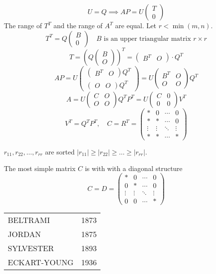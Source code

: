 $$ U = Q \implies AP = U \begin{pmatrix} T \\ 0 \end{pmatrix} $$
The range of $T^T$ and the range of $A^T$ are equal. \newline
Let \( r < \min(m, n) \).
\[ T^T = Q \begin{pmatrix} B \\ 0 \end{pmatrix} \quad B \text{ is an upper triangular matrix } r \times r \]
\[ T = \left(Q\begin{pmatrix} B \\ O \end{pmatrix}\right)^T = \begin{pmatrix} B^T & O \end{pmatrix} \cdot Q^T \]
\[ A P = U \begin{pmatrix} \begin{pmatrix} B^T & O \end{pmatrix} Q^T \\ \begin{pmatrix} O & O \end{pmatrix} Q^T \end{pmatrix} = U \begin{pmatrix} B^T & O \\ O & O \end{pmatrix} Q^T \]
\[ A = U \begin{pmatrix} C & O \\ O & O \end{pmatrix} Q^T P^T = U \begin{pmatrix} C & 0 \\ 0 & 0 \end{pmatrix}V^T \]
\[ V^T = Q^T P^T, \quad C = R^T = \begin{pmatrix}
\ast & 0 & \cdots & 0 \\
\ast & \ast & \cdots & 0 \\
\vdots & \vdots & \ddots & \vdots \\
\ast & \ast & \cdots & \ast 
\end{pmatrix}
\]

$r_{11}, r_{22}, \ldots, r_{rr}$ are sorted $|r_{11}| \geq |r_{22}| \geq \ldots \geq |r_{rr}|$.

The most simple matrix $C$ is with with a diagonal structure
\[
C = D = \begin{pmatrix}
    \ast & 0 & \cdots & 0 \\
    0 & \ast & \cdots & 0 \\
    \vdots & \vdots & \ddots & \vdots \\
    0 & 0 & \cdots & \ast 
    \end{pmatrix}
\]

\begin{tabular}{l l}
BELTRAMI & 1873 \\
JORDAN & 1875 \\
SYLVESTER & 1893 \\
ECKART-YOUNG & 1936 \\
\end{tabular}